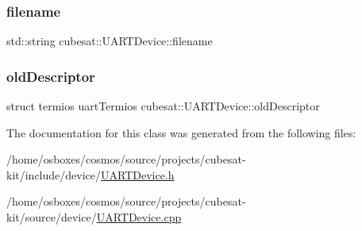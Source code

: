 \subsubsection{\texorpdfstring{filename}{filename}}
{\footnotesize\ttfamily std\+::string cubesat\+::\+U\+A\+R\+T\+Device\+::filename\hspace{0.3cm}{\ttfamily [private]}}

\mbox{\label{classcubesat_1_1UARTDevice_a3d85748f0c38b743ff4e6e139635c1cf}} 
\subsubsection{\texorpdfstring{old\+Descriptor}{oldDescriptor}}
{\footnotesize\ttfamily struct termios uart\+Termios cubesat\+::\+U\+A\+R\+T\+Device\+::old\+Descriptor\hspace{0.3cm}{\ttfamily [private]}}



The documentation for this class was generated from the following files\+:\begin{DoxyCompactItemize}
\item 
/home/osboxes/cosmos/source/projects/cubesat-\/kit/include/device/\hyperlink{UARTDevice_8h}{U\+A\+R\+T\+Device.\+h}\item 
/home/osboxes/cosmos/source/projects/cubesat-\/kit/source/device/\hyperlink{UARTDevice_8cpp}{U\+A\+R\+T\+Device.\+cpp}\end{DoxyCompactItemize}

